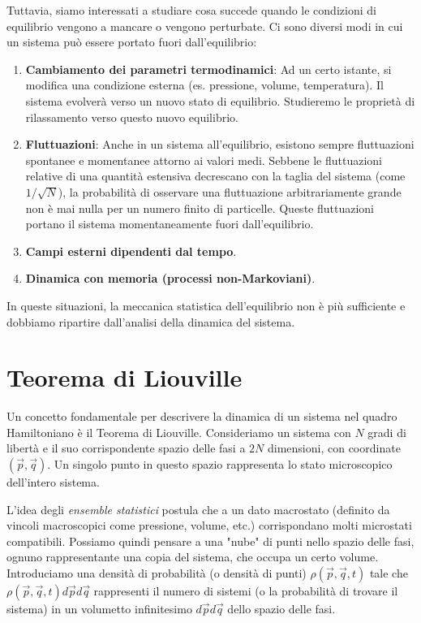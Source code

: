 Tuttavia, siamo interessati a studiare cosa succede quando le condizioni di equilibrio vengono a mancare o vengono perturbate. Ci sono diversi modi in cui un sistema può essere portato fuori dall'equilibrio:
\begin{enumerate}
    \item \textbf{Cambiamento dei parametri termodinamici}: Ad un certo istante, si modifica una condizione esterna (es. pressione, volume, temperatura). Il sistema evolverà verso un nuovo stato di equilibrio. Studieremo le proprietà di rilassamento verso questo nuovo equilibrio.
    \item \textbf{Fluttuazioni}: Anche in un sistema all'equilibrio, esistono sempre fluttuazioni spontanee e momentanee attorno ai valori medi. Sebbene le fluttuazioni relative di una quantità estensiva decrescano con la taglia del sistema (come $1/\sqrt{N}$), la probabilità di osservare una fluttuazione arbitrariamente grande non è mai nulla per un numero finito di particelle. Queste fluttuazioni portano il sistema momentaneamente fuori dall'equilibrio.
    \item \textbf{Campi esterni dipendenti dal tempo}.
    \item \textbf{Dinamica con memoria (processi non-Markoviani)}.
\end{enumerate}

In queste situazioni, la meccanica statistica dell'equilibrio non è più sufficiente e dobbiamo ripartire dall'analisi della dinamica del sistema.

\section{Teorema di Liouville}

Un concetto fondamentale per descrivere la dinamica di un sistema nel quadro Hamiltoniano è il Teorema di Liouville.
Consideriamo un sistema con $N$ gradi di libertà e il suo corrispondente spazio delle fasi a $2N$ dimensioni, con coordinate $(\vec{p}, \vec{q})$. Un singolo punto in questo spazio rappresenta lo stato microscopico dell'intero sistema.

L'idea degli \textit{ensemble statistici} postula che a un dato macrostato (definito da vincoli macroscopici come pressione, volume, etc.) corrispondano molti microstati compatibili. Possiamo quindi pensare a una "nube" di punti nello spazio delle fasi, ognuno rappresentante una copia del sistema, che occupa un certo volume. Introduciamo una densità di probabilità (o densità di punti) $\rho(\vec{p}, \vec{q}, t)$ tale che $\rho(\vec{p}, \vec{q}, t) d\vec{p} d\vec{q}$ rappresenti il numero di sistemi (o la probabilità di trovare il sistema) in un volumetto infinitesimo $d\vec{p} d\vec{q}$ dello spazio delle fasi.

